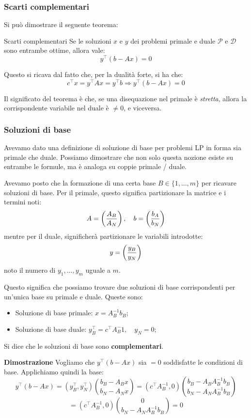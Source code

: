 \documentclass[a4paper,11pt]{article}
\begin{document}
\subsubsection{Scarti complementari}
Si può dimostrare il seguente teorema:
\begin{theorem}{Scarti complementari}
	Se le soluzioni $x$ e $y$ dei problemi primale e duale $\mathcal{P}$ e $\mathcal{D}$ sono entrambe ottime, allora vale:
	$$ y^\intercal (b - Ax) = 0 $$
\end{theorem}
Questo si ricava dal fatto che, per la dualità forte, si ha che:
$$
c^\intercal x = y^\intercal Ax = y^\intercal b \Rightarrow y^\intercal(b - Ax) = 0
$$

Il significato del teorema è che, se una disequazione nel primale è \textit{stretta}, allora la corrispondente variabile nel duale è $\neq 0$, e viceversa.

\subsubsection{Soluzioni di base}
Avevamo dato una definizione di soluzione di base per problemi LP in forma sia primale che duale.
Possiamo dimostrare che non solo questa nozione esiste su entrambe le formule, ma è analoga su coppie primale / duale.

Avevamo posto che la formazione di una certa base $B \in \{ 1, ..., m \}$ per ricavare soluzioni di base.
Per il primale, questo significa partizionare la matrice e i termini noti:
$$
A = \left( A_B \over A_N \right), \quad b = \left( b_A \over b_N \right)
$$
mentre per il duale, significherà partizionare le variabili introdotte:
$$
y = \left( y_B \over y_N \right)
$$
noto il numero di $y_1, ..., y_m$ uguale a $m$.

Questo significa che possiamo trovare due soluzioni di base corrispondenti per un'unica base su primale e duale.
Queste sono:
\begin{itemize}
	\item Soluzione di base primale: $ x = A_B^{-1} b_B $;
	\item Soluzione di base duale: $ y_B^\intercal = c^\intercal A_B^-1, \quad y_N = 0 $;
\end{itemize}
Si dice che le soluzioni di base sono \textbf{complementari}.

\par\smallskip
\noindent 
\textbf{\textsf{Dimostrazione}}
Vogliamo che $y^\intercal(b - Ax)$ sia $=0$ soddisfatte le condizioni di base.
Applichiamo quindi la base:
$$
y^\intercal(b - Ax) = \left( y_B^\intercal, y_N^\intercal \right) \binom{b_B - A_B x}{b_N - A_N x} = \left( c^\intercal A_B^{-1}, 0 \right) \binom{b_B - A_B A_B^{-1} b_B}{b_N - A_N A_B^{-1} b_B}
$$
$$
= \left( c^\intercal A_B^{-1}, 0 \right) \binom{0}{b_N - A_N A_B^{-1} b_B} = 0
$$
\end{document}
